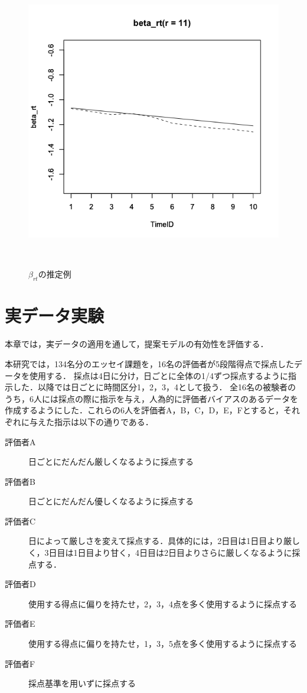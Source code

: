 \documentclass[a4paper,11pt,oneside,openany]{jsbook}
\begin{document}
\begin{figure}[tb]
\begin{minipage}[tb]{0.3\linewidth}
  \label{ICC2}
 \end{minipage}
 \begin{minipage}[tb]{0.3\linewidth}
  \centering
  \includegraphics[keepaspectratio,scale=0.25]{img/beta_rt_r_11.png}
  \label{ICC3}
 \end{minipage}\\
 \caption{$\beta_{rt}$の推定例}\label{beta_rt_recovery}
\end{figure}

\newpage
\chapter{実データ実験}
本章では，実データの適用を通して，提案モデルの有効性を評価する．

本研究では，134名分のエッセイ課題を，16名の評価者が5段階得点で採点したデータを使用する．
採点は4日に分け，日ごとに全体の1/4ずつ採点するように指示した．以降では日ごとに時間区分1，2，3，4として扱う．
全16名の被験者のうち，6人には採点の際に指示を与え，人為的に評価者バイアスのあるデータを作成するようにした．これらの6人を評価者A，B，C，D，E，Fとすると，それぞれに与えた指示は以下の通りである．

\begin{description}
  \item [評価者A]日ごとにだんだん厳しくなるように採点する
  \item [評価者B]日ごとにだんだん優しくなるように採点する
  \item [評価者C]日によって厳しさを変えて採点する．具体的には，2日目は1日目より厳しく，3日目は1日目より甘く，4日目は2日目よりさらに厳しくなるように採点する．
  \item [評価者D]使用する得点に偏りを持たせ，2，3，4点を多く使用するように採点する
  \item [評価者E]使用する得点に偏りを持たせ，1，3，5点を多く使用するように採点する
  \item [評価者F]採点基準を用いずに採点する
\end{description}
\end{document}
